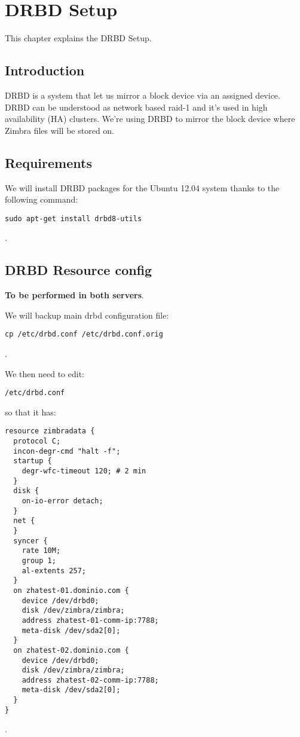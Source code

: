 

\chapter{DRBD Setup}
This chapter explains the DRBD Setup.

\section {Introduction}
DRBD is a system that let us mirror a block device via an assigned device. DRBD can be understood as network based raid-1 and it's used in high availability (HA) clusters.
We're using DRBD to mirror the block device where Zimbra files will be stored on.

\section {Requirements}
We will install DRBD packages for the Ubuntu 12.04 system thanks to the following command:
\begin{verbatim}
sudo apt-get install drbd8-utils
\end{verbatim}
.



\section {DRBD Resource config}
\textbf{To be performed in both servers}.

We will backup main drbd configuration file:
\begin{verbatim}
cp /etc/drbd.conf /etc/drbd.conf.orig
\end{verbatim}
.

We then need to edit:
\begin{verbatim}
/etc/drbd.conf
\end{verbatim}
so that it has:
\begin{verbatim}
resource zimbradata {
  protocol C;
  incon-degr-cmd "halt -f";
  startup {
    degr-wfc-timeout 120; # 2 min
  }
  disk {
    on-io-error detach;
  }
  net {
  }
  syncer {
    rate 10M;
    group 1;
    al-extents 257;
  }
  on zhatest-01.dominio.com {
    device /dev/drbd0;
    disk /dev/zimbra/zimbra;
    address zhatest-01-comm-ip:7788;
    meta-disk /dev/sda2[0];
  }
  on zhatest-02.dominio.com {
    device /dev/drbd0;
    disk /dev/zimbra/zimbra;
    address zhatest-02-comm-ip:7788;
    meta-disk /dev/sda2[0];
  }
}
\end{verbatim}
.

